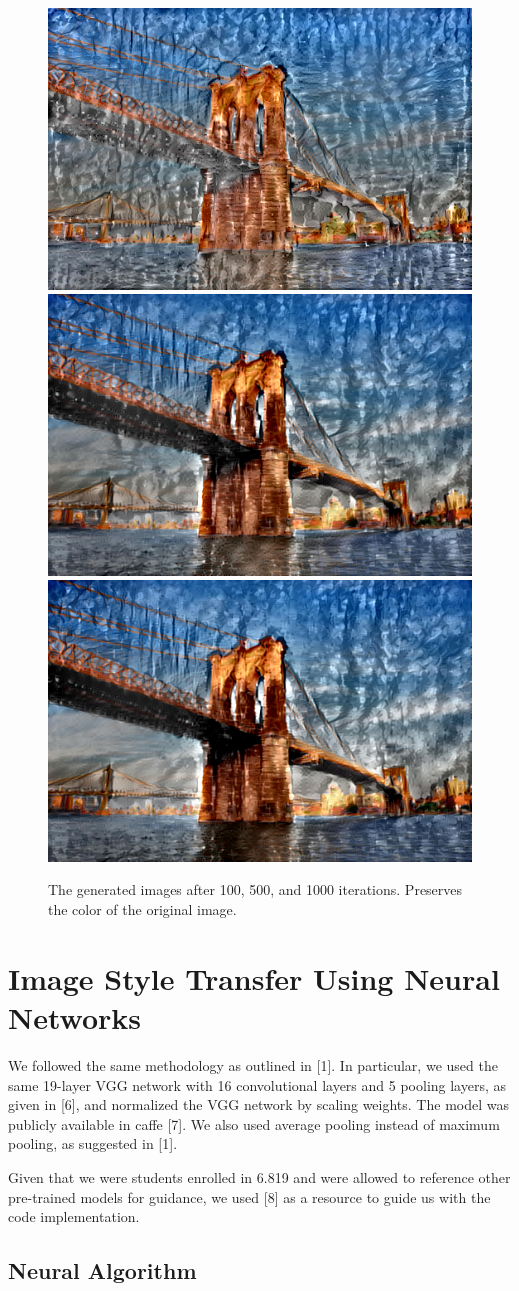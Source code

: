\documentclass[10pt,twocolumn,letterpaper]{article}
\begin{document}
\begin{figure}
\begin{center}
\includegraphics[width=0.3\linewidth]{painted_bridge_oc/out_100.png}
\includegraphics[width=0.3\linewidth]{painted_bridge_oc/out_500.png}
\includegraphics[width=0.3\linewidth]{painted_bridge_oc/out.png}
\end{center}
   \caption{The generated images after 100, 500, and 1000 iterations. Preserves the color of the original image.}
\label{fig:short}
\end{figure}

\section{Image Style Transfer Using Neural Networks}

We followed the same methodology as outlined in [1]. In particular, we used the same 19-layer VGG network with 16 convolutional layers and 5 pooling layers, as given in [6], and normalized the VGG network by scaling weights. The model was publicly available in caffe [7]. We also used average pooling instead of maximum pooling, as suggested in [1].

Given that we were students enrolled in 6.819 and were allowed to reference other pre-trained models for guidance, we used [8] as a resource to guide us with the code implementation.

\subsection{Neural Algorithm}
\end{document}
